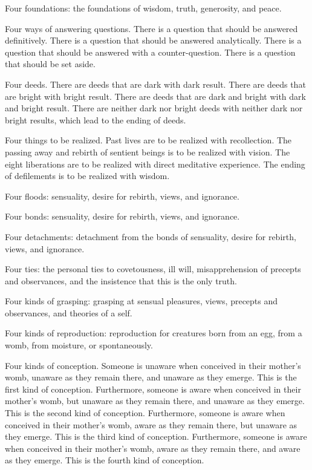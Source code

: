 \documentclass[12pt,openany]{book}%
\begin{document}
Four foundations: the foundations of wisdom, truth, generosity, and peace. 

Four ways of answering questions. There is a question that should be answered definitively. There is a question that should be answered analytically. There is a question that should be answered with a counter-question. There is a question that should be set aside. 

Four deeds. There are deeds that are dark with dark result. There are deeds that are bright with bright result. There are deeds that are dark and bright with dark and bright result. There are neither dark nor bright deeds with neither dark nor bright results, which lead to the ending of deeds. 

Four things to be realized. Past lives are to be realized with recollection. The passing away and rebirth of sentient beings is to be realized with vision. The eight liberations are to be realized with direct meditative experience. The ending of defilements is to be realized with wisdom. 

Four floods: sensuality, desire for rebirth, views, and ignorance. 

Four bonds: sensuality, desire for rebirth, views, and ignorance. 

Four detachments: detachment from the bonds of sensuality, desire for rebirth, views, and ignorance. 

Four ties: the personal ties to covetousness, ill will, misapprehension of precepts and observances, and the insistence that this is the only truth. 

Four kinds of grasping: grasping at sensual pleasures, views, precepts and observances, and theories of a self. 

Four kinds of reproduction: reproduction for creatures born from an egg, from a womb, from moisture, or spontaneously. 

Four kinds of conception. Someone is unaware when conceived in their mother’s womb, unaware as they remain there, and unaware as they emerge. This is the first kind of conception. Furthermore, someone is aware when conceived in their mother’s womb, but unaware as they remain there, and unaware as they emerge. This is the second kind of conception. Furthermore, someone is aware when conceived in their mother’s womb, aware as they remain there, but unaware as they emerge. This is the third kind of conception. Furthermore, someone is aware when conceived in their mother’s womb, aware as they remain there, and aware as they emerge. This is the fourth kind of conception. 
\end{document}
